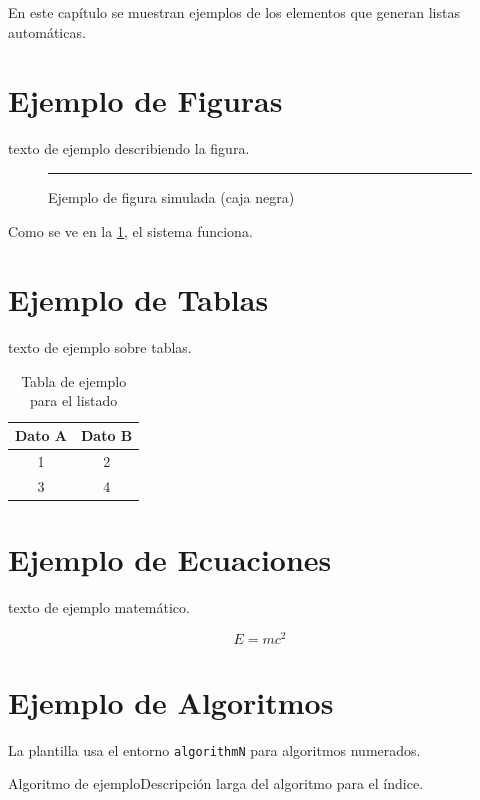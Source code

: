 En este capítulo se muestran ejemplos de los elementos que generan listas automáticas.

\section{Ejemplo de Figuras}
texto de ejemplo describiendo la figura.

\begin{figure}[h]
    \centering
    \rule{10cm}{5cm} 
    \caption{Ejemplo de figura simulada (caja negra)}
    \label{fig:ejemplo_figura}
\end{figure}

Como se ve en la \cref{fig:ejemplo_figura}, el sistema funciona.

\section{Ejemplo de Tablas}
texto de ejemplo sobre tablas.

\begin{table}[h]
    \centering
    \begin{tabular}{|c|c|}
        \hline
        \textbf{Dato A} & \textbf{Dato B} \\
        \hline
        1 & 2 \\
        3 & 4 \\
        \hline
    \end{tabular}
    \caption{Tabla de ejemplo para el listado}
    \label{tab:ejemplo_tabla}
\end{table}

\section{Ejemplo de Ecuaciones}
texto de ejemplo matemático.

\begin{equation}
    E = mc^2
    \label{eq:einstein}
\end{equation}

\section{Ejemplo de Algoritmos}
La plantilla usa el entorno \texttt{algorithmN} para algoritmos numerados.

\begin{algorithmN}{Algoritmo de ejemplo}{Descripción larga del algoritmo para el índice.}
    \BlankLine
    \;
\end{algorithmN}

